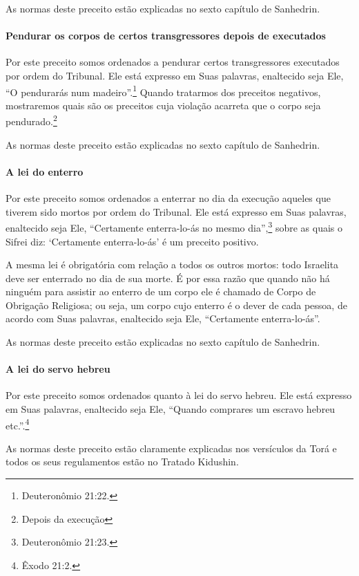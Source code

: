 As normas deste preceito estão explicadas no sexto capítulo de Sanhedrin.


\paragraph{Pendurar os corpos de certos transgressores depois de executados}

Por este preceito somos ordenados a pendurar certos transgressores
executados por ordem do Tribunal. Ele está expresso em Suas palavras,
enaltecido seja Ele, ``O pendurarás num madeiro''.\footnote{Deuteronômio 21:22.}
Quando tratarmos dos preceitos negativos, mostraremos quais são os
preceitos cuja violação acarreta que o corpo seja
pendurado.\footnote{Depois da execução}

As normas deste preceito estão explicadas no sexto capítulo de Sanhedrin.

\paragraph{A lei do enterro}

Por este preceito somos ordenados a enterrar no dia da execução aqueles
que tiverem sido mortos por ordem do Tribunal. Ele está expresso em Suas
palavras, enaltecido seja Ele, ``Certamente enterra-lo-ás no mesmo dia'',\footnote{Deuteronômio 21:23.} sobre as quais o Sifrei diz: `Certamente
enterra-lo-ás' é um preceito positivo.

A mesma lei é obrigatória com relação a todos os outros mortos: todo
Israelita deve ser enterrado no dia de sua morte. É por essa razão que
quando não há ninguém para assistir ao enterro de um corpo ele é
chamado de Corpo de Obrigação Religiosa; ou seja, um corpo cujo enterro
é o dever de cada pessoa, de acordo com Suas palavras, enaltecido seja
Ele, ``Certamente enterra-lo-ás''.

As normas deste preceito estão explicadas no sexto capítulo de Sanhedrin.

\paragraph{A lei do servo hebreu}

Por este preceito somos ordenados quanto à lei do servo hebreu. Ele está
expresso em Suas palavras, enaltecido seja Ele, ``Quando comprares um
escravo hebreu etc.''.\footnote{Êxodo 21:2.}

As normas deste preceito estão claramente explicadas nos versículos da
Torá e todos os seus regulamentos estão no Tratado Kidushin.

